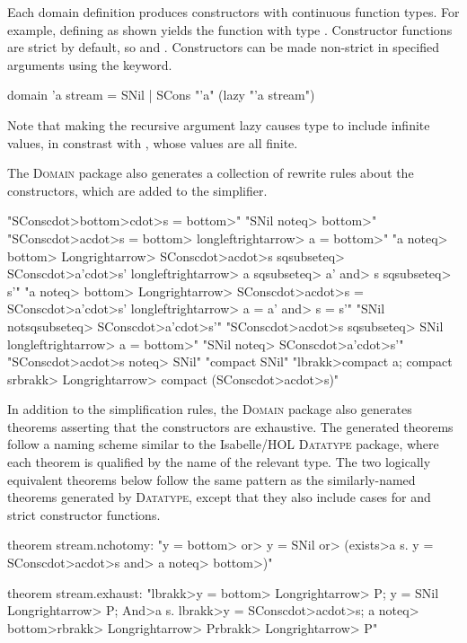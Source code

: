 Each domain definition produces constructors with continuous function types. For example, defining  as shown yields the function  with type . Constructor functions are strict by default, so  and . Constructors can be made non-strict in specified arguments using the  keyword.
%
\begin{isacode}
domain 'a stream = SNil | SCons "'a" (lazy "'a stream")
\end{isacode}
%
Note that making the recursive argument lazy causes type  to include infinite values, in constrast with , whose values are all finite.

The \textsc{Domain} package also generates a collection of rewrite rules about the constructors, which are added to the simplifier.
%
\begin{isacode}
"SCons\<cdot>\<bottom>\<cdot>s = \<bottom>"
"SNil \<noteq> \<bottom>"
"SCons\<cdot>a\<cdot>s = \<bottom> \<longleftrightarrow> a = \<bottom>"
"a \<noteq> \<bottom> \<Longrightarrow> SCons\<cdot>a\<cdot>s \<sqsubseteq> SCons\<cdot>a'\<cdot>s' \<longleftrightarrow> a \<sqsubseteq> a' \<and> s \<sqsubseteq> s'"
"a \<noteq> \<bottom> \<Longrightarrow> SCons\<cdot>a\<cdot>s = SCons\<cdot>a'\<cdot>s' \<longleftrightarrow> a = a' \<and> s = s'"
"SNil \<notsqsubseteq> SCons\<cdot>a'\<cdot>s'"
"SCons\<cdot>a\<cdot>s \<sqsubseteq> SNil \<longleftrightarrow> a = \<bottom>"
"SNil \<noteq> SCons\<cdot>a'\<cdot>s'"
"SCons\<cdot>a\<cdot>s \<noteq> SNil"
"compact SNil"
"\<lbrakk>compact a; compact s\<rbrakk> \<Longrightarrow> compact (SCons\<cdot>a\<cdot>s)"
\end{isacode}

In addition to the simplification rules, the \textsc{Domain} package also generates theorems asserting that the constructors are exhaustive. The generated theorems follow a naming scheme similar to the Isabelle/HOL \textsc{Datatype} package, where each theorem is qualified by the name of the relevant type. The two logically equivalent theorems below follow the same pattern as the similarly-named theorems generated by \textsc{Datatype}, except that they also include cases for  and strict constructor functions.
%
\begin{isacode}
theorem stream.nchotomy:
  "y = \<bottom> \<or> y = SNil \<or> (\<exists>a s. y = SCons\<cdot>a\<cdot>s \<and> a \<noteq> \<bottom>)"
\end{isacode}
\unmedskip
{}
\begin{isacode}
theorem stream.exhaust:
  "\<lbrakk>y = \<bottom> \<Longrightarrow> P; y = SNil \<Longrightarrow> P; \<And>a s. \<lbrakk>y = SCons\<cdot>a\<cdot>s; a \<noteq> \<bottom>\<rbrakk> \<Longrightarrow> P\<rbrakk> \<Longrightarrow> P"
\end{isacode}

